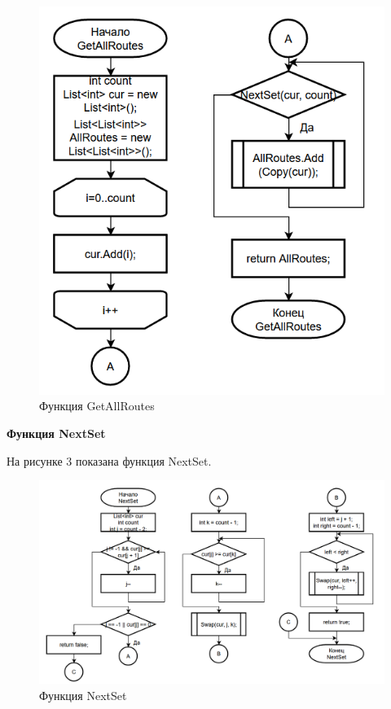 \documentclass[14pt, a4paper]{extarticle}
\begin{document}
\begin{figure}[h!]
	\centering
	\includegraphics[scale=1]{source/GetAllRoutes.png}
	\caption{Функция GetAllRoutes}
\end{figure}
\newpage
\textbf{Функция NextSet}\par
На рисунке 3 показана функция NextSet.
\begin{figure}[h!]
	\centering
	\includegraphics[width=\linewidth]{source/NextSet.png}
	\caption{Функция NextSet}
\end{figure}
\newpage
\end{document}
